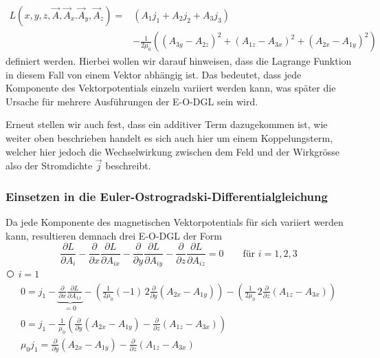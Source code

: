 	
	\begin{align}
	\label{maxwell:magnetostatikLagrange}
	L\left(x,y,z, \vec{A}, \vec{A}_x. \vec{A}_y, \vec{A}_z\right)
	=&\left( A_1j_1 + A_2j_2 + A_3j_3\right) \\ \nonumber
	 &- \frac{1}{2\mu_0}\left( 
	\left( A_{3y} - A_{2z}\right)^2 
	+ \left(A_{1z} -A_{3x}\right)^2
	+ \left(A_{2x} -A_{1y}\right)^2   
	\right)
	\end{align}
definiert werden. 
Hierbei wollen wir darauf hinweisen, dass die Lagrange Funktion in diesem Fall von einem Vektor abhängig ist. 
Das bedeutet, dass jede Komponente des Vektorpotentials einzeln variiert werden kann, was später die Ursache für mehrere Ausführungen der E-O-DGL sein wird.

Erneut stellen wir auch fest, dass ein additiver Term dazugekommen ist, wie weiter oben beschrieben handelt es sich auch hier um einem Koppelungsterm, welcher hier jedoch die Wechselwirkung zwischen dem Feld und der Wirkgrösse also der Stromdichte $\vec{j}$ beschreibt.

\subsubsection{Einsetzen in die Euler-Ostrogradski-Differentialgleichung}

Da jede Komponente des magnetischen Vektorpotentials für sich variiert werden kann, resultieren demnach drei E-O-DGL der Form
\[ 
\frac{\partial L}{\partial A_i} 
- \frac{\partial}{\partial x}\frac{\partial L}{\partial A_{ix}}
- \frac{\partial}{\partial y}\frac{\partial L}{\partial A_{iy}}
- \frac{\partial}{\partial z}\frac{\partial L}{\partial A_{iz}}
= 0 \qquad \text{für } i=1,2,3
 \]
{\larger\textcircled{}} $i = 1$
\begin{subequations}
\begin{gather}
	0
	=
	j_1 - \underbrace{\frac{\partial}{\partial x}\frac{\partial L}{\partial A_{1x}}}_{=0}
	 - \left( \frac{1}{2\mu_0}(-1)\,2 \frac{\partial}{\partial y}(A_{2x}-A_{1y})\right) 
	 - \left( \frac{1}{2\mu_0}\,2\frac{\partial}{\partial z}(A_{1z}-A_{3x})\right)
	 \\
	 0
	 =
	 j_1 - \frac{1}{\mu_0}\left( \frac{\partial}{\partial y}(A_{2x}-A_{1y})
	 - \frac{\partial}{\partial z}(A_{1z}-A_{3x})
	 \right)  
	 \\	 
	 \mu_0j_1
	 =
	 \frac{\partial}{\partial y}(A_{2x}-A_{1y})
	 - \frac{\partial}{\partial z}(A_{1z}-A_{3x})	 	 	 
\end{gather}
\end{subequations}

